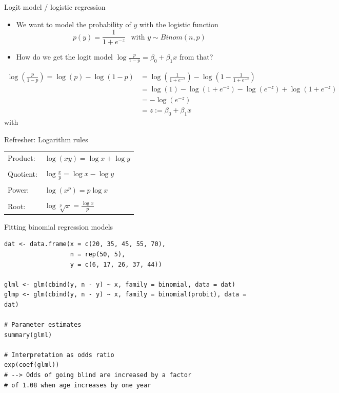 \documentclass[aspectratio=169]{beamer}
\begin{document}
\begin{frame}{Logit model / logistic regression}
  \begin{itemize}
    \item We want to model the probability of $y$ with the logistic
      function
  \begin{equation*}
    p(y) = \frac{1}{1 + e^{-z}}~~\text{  with } y \sim Binom(n, p)
  \end{equation*}
    \item How do we get the logit model $\log\frac{p}{1 - p} =
      \beta_0 + \beta_1 x$ from that?
  \end{itemize}\pause
      \begin{align*}
        \log\left(\frac{p}{1 - p}\right) = \log(p) - \log(1-p) 
        & = \log\left(\frac{1}{1 + e^{-z}}\right) - \log\left(1 - \frac{1}{1 + e^{-z}}\right) \\
        & = \log(1) - \log(1 + e^{-z}) - \log(e^{-z}) + \log(1 + e^{-z}) \\
        & = -\log(e^{-z})\\
        & = z := \beta_0 + \beta_1 x
      \end{align*}
     with 
\end{frame}

\begin{frame}{Refresher: Logarithm rules}

\begin{tabular}{p{2cm}l}
  Product:  & $\log(xy)=\log x+\log y$ \\
  &\\
  Quotient: & $\log\!{\frac {x}{y}}=\log x-\log y$ \\
  &\\
  Power:    & $\log\left(x^{p}\right)=p\log x$ \\
  &\\
  Root:     & $\log{\sqrt[{p}]{x}}={\frac {\log x}{p}}$ \\
\end{tabular}

\end{frame}

\begin{frame}[fragile]{Fitting binomial regression models}
\begin{lstlisting}
dat <- data.frame(x = c(20, 35, 45, 55, 70),
                  n = rep(50, 5),
                  y = c(6, 17, 26, 37, 44))

glml <- glm(cbind(y, n - y) ~ x, family = binomial, data = dat)
glmp <- glm(cbind(y, n - y) ~ x, family = binomial(probit), data = dat)

# Parameter estimates
summary(glml)

# Interpretation as odds ratio
exp(coef(glml))
# --> Odds of going blind are increased by a factor
# of 1.08 when age increases by one year
\end{lstlisting}
\end{frame}
\end{document}
